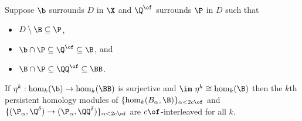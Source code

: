 \begin{lemma}
  Suppose $\b$ surrounds $D$ in $\X$ and $\Q^\of$ surrounds $\P$ in $D$ such that
  \begin{itemize}
    \item $D\setminus \B\subseteq \P$,
    \item $\b\cap \P \subseteq \Q^\of\subseteq \B$, and
    \item $\B\cap \P\subseteq \QQ^\of\subseteq \BB$.
  \end{itemize}

  If $\eta^k : \hom_k(\b)\to \hom_k(\BB)$ is surjective and $\im~\eta^k\cong \hom_k(\B)$ then the $k$th persistent homology modules of $\{\hom_k(B_\alpha, \B)\}_{\alpha < 2c\of}$ and $\{(\P_\alpha, \Q^\delta)\to (\P_\alpha,\QQ^\delta)\}_{\alpha < 2c\of}$ are $c\of$-interleaved for all $k$.
\end{lemma}

